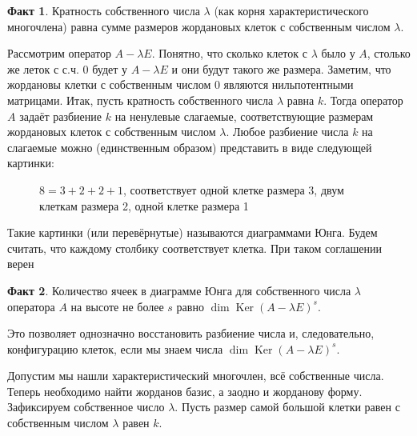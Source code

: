 \documentclass[10pt,a4paper,oneside]{book}
\theoremstyle{definition}
\newtheorem*{fact}{Факт}
\DeclareMathOperator{\Ker}{Ker}
\begin{document}
\begin{fact} Кратность собственного числа $\lambda$ (как корня характеристического многочлена) равна сумме размеров жордановых клеток с
собственным числом $\lambda$.
\end{fact}

Рассмотрим оператор $A-\lambda E$. Понятно, что сколько клеток с $\lambda$ было у $A$, столько же леток с с.ч. 0 будет у $A-\lambda E$ и они будут такого же размера.
Заметим, что жордановы клетки с собственным числом 0 являются нильпотентными матрицами.
Итак, пусть кратность собственного числа $\lambda$ равна $k$. Тогда оператор $A$ задаёт разбиение $k$ на ненулевые слагаемые,
соответствующие размерам жордановых клеток с собственным числом $\lambda$. Любое разбиение числа $k$ на слагаемые можно (единственным образом) представить в виде следующей картинки:


\begin{figure}[hhh]
\begin{center}
\end{center}
\caption{$8=3+2+2+1$, соответствует одной клетке размера 3, двум клеткам размера 2, одной клетке размера 1}
\end{figure}

Такие картинки (или перевёрнутые) называются диаграммами Юнга. Будем считать, что каждому столбику соответствует клетка. При таком соглашении верен 


\begin{fact} Количество ячеек в диаграмме Юнга для собственного числа $\lambda$ оператора $A$ на высоте не более $s$ равно $\dim \Ker(A - \lambda E)^s $.

Это  позволяет однозначно восстановить разбиение числа и, следовательно, конфигурацию клеток, если мы знаем числа $\dim \Ker(A - \lambda E)^s $.
\end{fact}





Допустим мы нашли характеристический многочлен, всё собственные числа. Теперь необходимо найти жорданов базис, а заодно и жорданову форму. Зафиксируем собственное число $\lambda$. Пусть размер самой большой клетки равен с собственным числом $\lambda$ равен $k$.
\end{document}
